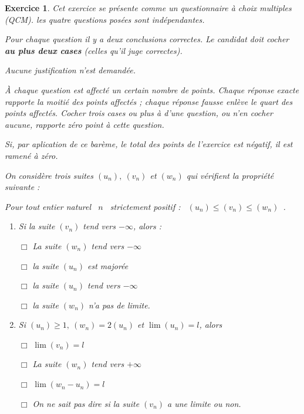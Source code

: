 \documentclass[12pt,a4paper,french]{article}
\theoremstyle{break}
\newtheorem{exercice}{Exercice}
\theoremstyle{nonumberplain}
\theoremstyle{nonumberbreak}
\begin{document}
\begin{exercice}
  Cet exercice se présente comme un questionnaire à choix multiples
  (QCM). les quatre questions posées sont indépendantes.

  Pour chaque question il y a deux conclusions correctes. Le candidat
  doit cocher \textbf{au plus deux cases} (celles qu'il juge correctes).

  Aucune justification n'est demandée.

  À chaque question est affecté  un certain nombre de points. Chaque
  réponse exacte rapporte la moitié des  points affectés ; chaque
  réponse fausse enlève le quart des points affectés. Cocher trois cases
  ou plus à d'une question, ou n'en cocher aucune, rapporte zéro point à
  cette question.

  Si, par aplication de ce barème, le total des points de l'exercice est
  négatif, il est ramené à zéro.


  On considère trois suites $\left(u_{n}\right),~ \left(v_{n}\right)$ et
  $\left(w_{n}\right)$ qui vérifient la propriété suivante :

  \begin{center}
    \og Pour tout entier naturel~ $n$~ strictement positif :~
    $\left(u_{n}\right) \leqslant \left(v_{n}\right) \leqslant
    \left(w_{n}\right)$~\fg.
\end{center}

  \begin{enumerate}
    \item Si la suite $\left(v_{n}\right)$ tend vers $- \infty$, alors :

      $\Box$ La suite $\left(w_{n}\right)$ tend vers $- \infty$

      $\Box$ la suite $\left(u_{n}\right)$ est majorée

      $\Box$ la suite $\left(u_{n}\right)$ tend vers $- \infty$

      $\Box$ la suite $\left(w_{n}\right)$ n'a pas de limite.

    \item Si $\left(u_{n}\right) \geqslant 1,~\left(w_{n}\right) =
      2\left(u_{n}\right)$ et $\lim \left(u_{n}\right) = l$, alors

      $\Box$ $\lim  \left(v_{n}\right) = l$

      $\Box$ La suite $\left(w_{n}\right)$ tend vers $+ \infty$

      $\Box$ $\lim (w_{n} - u_{n})= l$

      $\Box$ On ne sait pas dire si la suite $\left(v_{n}\right)$ a une
      limite ou non.


\end{enumerate}
\end{exercice}
\end{document}
